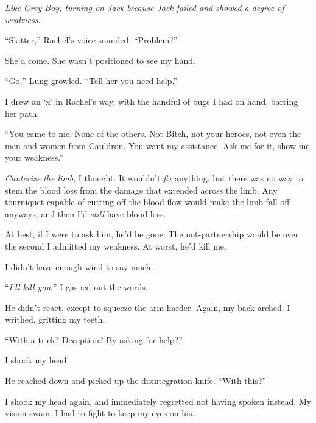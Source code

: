 \emph{Like Grey Boy, turning on Jack because Jack failed and showed a degree of weakness}.



``Skitter,'' Rachel's voice sounded.  ``Problem?''



She'd come.  She wasn't positioned to see my hand.



``Go,'' Lung growled.  ``Tell her you need help.''



I drew an `x' in Rachel's way, with the handful of bugs I had on hand, barring her path.



``You came to me.  None of the others.  Not Bitch, not your heroes, not even the men and women from Cauldron.  You want my assistance.  Ask me for it, show me your weakness.''



\emph{Cauterize the limb}, I thought.  It wouldn't \emph{fix} anything, but there was no way to stem the blood loss from the damage that extended across the limb.  Any tourniquet capable of cutting off the blood flow would make the limb fall off anyways, and then I'd \emph{still} have blood loss.



At best, if I were to ask him, he'd be gone.  The not-partnership would be over the second I admitted my weakness.  At worst, he'd kill me.



I didn't have enough wind to say much.



``\emph{I'll kill you},'' I gasped out the words.



He didn't react, except to squeeze the arm harder.  Again, my back arched.  I writhed, gritting my teeth.



``With a trick?  Deception?  By asking for help?''



I shook my head.



He reached down and picked up the disintegration knife.  ``With this?''



I shook my head again, and immediately regretted not having spoken instead.  My vision swam.  I had to fight to keep my eyes on his.



